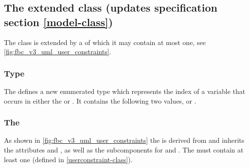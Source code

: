
\subsection{The extended  class (updates specification section \ref{model-class})}
\label{model-class-kv}

The \SBML \Model class is extended by a  of which it may contain at most one, see  \ref{fig:fbc_v3_uml_user_constraints}.

\subsubsection{Type }
\label{primtype-fbcvariabletype}

The \FBCPackage defines a new enumerated type  which
represents the index of a variable that occurs in either the \FluxObjective or \UserConstraintComponent. It contains the following two values,  or .


%

\subsubsection{The \FBC {}}
\label{listofuserconstraints-class}

As shown in \ref{fig:fbc_v3_uml_user_constraints} the \ListOfUserConstraints is derived from \SBase and inherits the attributes  and , as well as
the subcomponents for \Annotation and \Notes. The \ListOfUserConstraints must contain at least one \UserConstraint (defined in \ref{userconstraint-class}).

